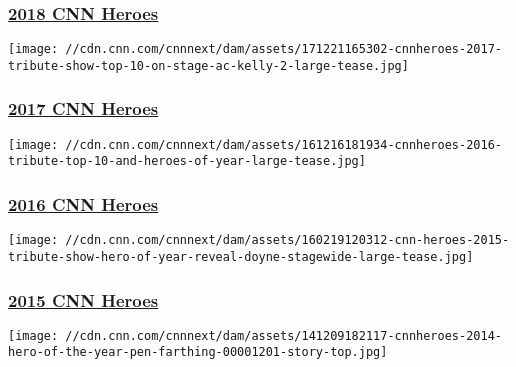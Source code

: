 \hypertarget{2018-cnn-heroes}{%
\subsubsection{\texorpdfstring{\href{http://www.cnn.com/specials/cnn-heroes-2018-archive}{2018
CNN Heroes}}{2018 CNN Heroes}}\label{2018-cnn-heroes}}

\href{https://www.cnn.com/specials/cnn-heroes-2017-archive}{}

\texttt{[image: //cdn.cnn.com/cnnnext/dam/assets/171221165302-cnnheroes-2017-tribute-show-top-10-on-stage-ac-kelly-2-large-tease.jpg]}

\hypertarget{2017-cnn-heroes}{%
\subsubsection{\texorpdfstring{\href{https://www.cnn.com/specials/cnn-heroes-2017-archive}{2017
CNN Heroes}}{2017 CNN Heroes}}\label{2017-cnn-heroes}}

\href{http://www.cnn.com/specials/cnn-heroes-2016-archive}{}

\texttt{[image: //cdn.cnn.com/cnnnext/dam/assets/161216181934-cnnheroes-2016-tribute-top-10-and-heroes-of-year-large-tease.jpg]}

\hypertarget{2016-cnn-heroes}{%
\subsubsection{\texorpdfstring{\href{http://www.cnn.com/specials/cnn-heroes-2016-archive}{2016
CNN Heroes}}{2016 CNN Heroes}}\label{2016-cnn-heroes}}

\href{http://www.cnn.com/specials/cnn-heroes-2015-archive}{}

\texttt{[image: //cdn.cnn.com/cnnnext/dam/assets/160219120312-cnn-heroes-2015-tribute-show-hero-of-year-reveal-doyne-stagewide-large-tease.jpg]}

\hypertarget{2015-cnn-heroes}{%
\subsubsection{\texorpdfstring{\href{http://www.cnn.com/specials/cnn-heroes-2015-archive}{2015
CNN Heroes}}{2015 CNN Heroes}}\label{2015-cnn-heroes}}

\href{http://www.cnn.com/specials/cnn-heroes-2014-archive}{}

\texttt{[image: //cdn.cnn.com/cnnnext/dam/assets/141209182117-cnnheroes-2014-hero-of-the-year-pen-farthing-00001201-story-top.jpg]}

